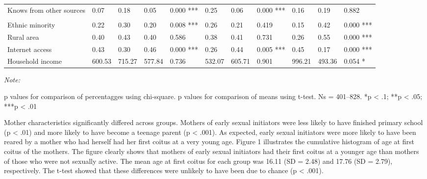 \documentclass[
]{article}
\begin{document}
\begin{landscape}
\begin{table}[!h]
{\begin{threeparttable}
\begin{tabular}[t]{lllllllllll}
\hspace{1em}Knows from other sources & 0.07 & 0.18 & 0.05 & 0.000 *** & 0.25 & 0.06 & 0.000 *** & 0.16 & 0.19 & 0.882\\
\addlinespace[0.8em]
\multicolumn{11}{l}{\textit{Household-related variables}}\\
\hspace{1em}Ethnic minority & 0.22 & 0.30 & 0.20 & 0.008 *** & 0.26 & 0.21 & 0.419 & 0.15 & 0.42 & 0.000 ***\\
\hspace{1em}Rural area & 0.40 & 0.43 & 0.40 & 0.586 & 0.38 & 0.41 & 0.731 & 0.26 & 0.55 & 0.000 ***\\
\hspace{1em}Internet access & 0.43 & 0.30 & 0.46 & 0.000 *** & 0.26 & 0.44 & 0.005 *** & 0.45 & 0.17 & 0.000 ***\\
\hspace{1em}Household income & 600.53 & 715.27 & 577.84 & 0.736 & 532.07 & 605.71 & 0.901 & 996.21 & 493.36 & 0.054  *\\
\bottomrule
\end{tabular}
\begin{tablenotes}[para]
\item \textit{Note: } 
\item p values for comparison of percentagges using chi-square. p values for comparison of means using t-test. Ns = 401–828. *p < .1; **p < .05; ***p < .01
\end{tablenotes}
\end{threeparttable}}
\end{table}
\end{landscape}
\newpage

Mother characteristics significantly differed across groups. Mothers of
early sexual initiators were less likely to have finished primary school
(p \textless{} .01) and more likely to have become a teenage parent (p
\textless{} .001). As expected, early sexual initiators were more likely
to have been reared by a mother who had herself had her first coitus at
a very young age. Figure 1 illustrates the cumulative histogram of age
at first coitus of the mothers. The figure clearly shows that mothers of
early sexual initiators had their first coitus at a younger age than
mothers of those who were not sexually active. The mean age at first
coitus for each group was 16.11 (SD = 2.48) and 17.76 (SD = 2.79),
respectively. The t-test showed that these differences were unlikely to
have been due to chance (p \textless{} .001).
\end{document}
